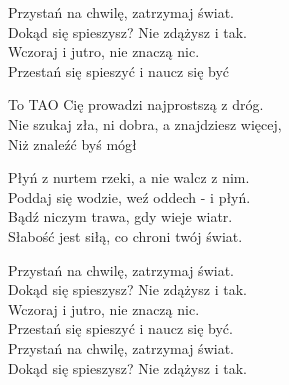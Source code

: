 \begin{text}
    Przystań na chwilę, zatrzymaj świat.\\
    Dokąd się spieszysz? Nie zdążysz i tak.\\
    Wczoraj i jutro, nie znaczą nic.\\
    Przestań się spieszyć i naucz się być

    \vin To TAO Cię prowadzi najprostszą z dróg.\\
    \vin Nie szukaj zła, ni dobra, a znajdziesz więcej,\\
    \vin Niż znaleźć byś mógł

    Płyń z nurtem rzeki, a nie walcz z nim.\\
    Poddaj się wodzie, weź oddech - i płyń.\\
    Bądź niczym trawa, gdy wieje wiatr.\\
    Słabość jest siłą, co chroni twój świat.

    Przystań na chwilę, zatrzymaj świat.\\
    Dokąd się spieszysz? Nie zdążysz i tak.\\
    Wczoraj i jutro, nie znaczą nic.\\
    Przestań się spieszyć i naucz się być.\\
    Przystań na chwilę, zatrzymaj świat.\\
    Dokąd się spieszysz? Nie zdążysz i tak.
\end{text}
\begin{chord}

\end{chord}